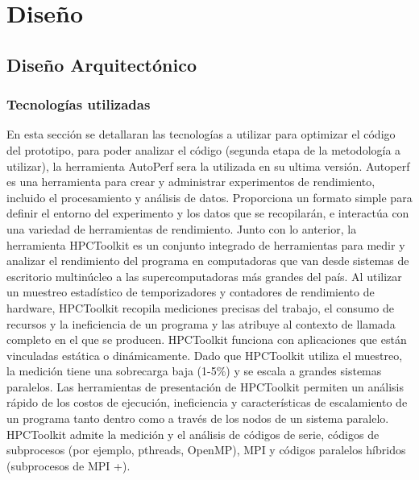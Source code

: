 
\chapter{Diseño}\label{ch:Diseno}

\section{Diseño Arquitectónico}\label{sc:DA}
    \subsection{Tecnologías utilizadas}\label{ssc:tech}
    En esta sección se detallaran las tecnologías a utilizar para optimizar el código del prototipo,
    para poder analizar el código (segunda etapa de la metodología a utilizar), la herramienta AutoPerf
    sera la utilizada en su ultima versión.
    Autoperf es una herramienta para crear y administrar experimentos de rendimiento, incluido el procesamiento y análisis de datos.
    Proporciona un formato simple para definir el entorno del experimento y los datos que se recopilarán, e interactúa con una variedad de herramientas de rendimiento. Junto con lo anterior, la herramienta  HPCToolkit es un conjunto integrado de herramientas para medir y analizar el rendimiento del programa en computadoras que van desde sistemas de escritorio multinúcleo a las supercomputadoras más grandes del país.
    Al utilizar un muestreo estadístico de temporizadores y contadores de rendimiento de hardware, HPCToolkit recopila mediciones precisas del trabajo, el consumo de recursos y la ineficiencia de un programa y las atribuye al contexto de llamada completo en el que se producen. HPCToolkit funciona con aplicaciones que están vinculadas estática o dinámicamente.
    Dado que HPCToolkit utiliza el muestreo, la medición tiene una sobrecarga baja (1-5\%) y se escala a grandes sistemas paralelos. Las herramientas de presentación de HPCToolkit permiten un análisis rápido de los costos de ejecución, ineficiencia y características de escalamiento de un programa tanto dentro como a través de los nodos de un sistema paralelo. HPCToolkit admite la medición y el análisis de códigos de serie, códigos de subprocesos (por ejemplo, pthreads, OpenMP), MPI y códigos paralelos híbridos (subprocesos de MPI +).

